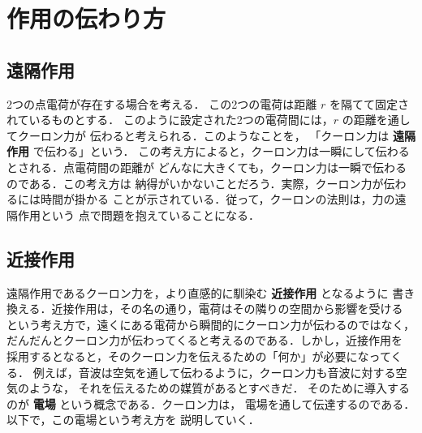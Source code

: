             \section{作用の伝わり方}
            \subsection{遠隔作用}
            2つの点電荷が存在する場合を考える．
            この2つの電荷は距離 $r$ を隔てて固定されているものとする．
            このように設定された2つの電荷間には，$r$ の距離を通してクーロン力が
            伝わると考えられる．このようなことを，
            「クーロン力は \textbf{遠隔作用} で伝わる」という．
            この考え方によると，クーロン力は一瞬にして伝わるとされる．点電荷間の距離が
            どんなに大きくても，クーロン力は一瞬で伝わるのである．この考え方は
            納得がいかないことだろう．実際，クーロン力が伝わるには時間が掛かる
            ことが示されている．従って，クーロンの法則は，力の遠隔作用という
            点で問題を抱えていることになる．

            \subsection{近接作用}
            遠隔作用であるクーロン力を，より直感的に馴染む \textbf{近接作用} となるように
            書き換える．近接作用は，その名の通り，電荷はその隣りの空間から影響を受ける
            という考え方で，遠くにある電荷から瞬間的にクーロン力が伝わるのではなく，
            だんだんとクーロン力が伝わってくると考えるのである．しかし，近接作用を
            採用するとなると，そのクーロン力を伝えるための「何か」が必要になってくる．
            例えば，音波は空気を通して伝わるように，クーロン力も音波に対する空気のような，
            それを伝えるための媒質があるとすべきだ．
            そのために導入するのが \textbf{電場} という概念である．クーロン力は，
            電場を通して伝達するのである．以下で，この電場という考え方を
            説明していく．


